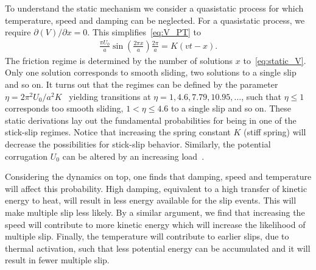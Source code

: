 To understand the static mechanism we consider a quasistatic process for which temperature, speed and damping can be neglected. For a quasistatic process, we require $\partial(V)/\partial x = 0$. This simplifies~\cref{eq:V_PT} to 
\begin{align}
  \frac{\pi U_0}{a} \sin\left(\frac{2\pi x}{a}\right) \frac{2 \pi}{a} = K(vt - x).
  \label{eq:static_V}
\end{align}
The friction regime is determined by the number of solutions $x$ to~\cref{eq:static_V}. Only one solution corresponds to
smooth sliding, two solutions to a single slip and so on. It turns out that the
regimes can be defined by the parameter $\eta = 2\pi^2U_0/a^2K$~\cite{Johnson_1998, Medyanik_2006} yielding transitions at $\eta = 1, 4.6, 7.79, 10.95, \hdots$, such that $\eta \le 1$
corresponds too smooth sliding, $1<\eta \le 4.6$ to a single slip and so on. These static derivations lay out the fundamental probabilities for being in one of the stick-slip regimes. Notice that increasing the spring constant $K$ (stiff spring) will decrease the possibilities for stick-slip behavior. Similarly, the potential corrugation $U_0$ can be altered by an increasing load~\cite{Vanossi_2013}.

Considering the dynamics on top, one finds that damping, speed and temperature will affect this probability. High damping, equivalent to a high transfer
of kinetic energy to heat, will result in less energy available for the slip events. This will make multiple slip less likely. By a similar argument, we find that increasing the speed will contribute to more kinetic energy which will increase the likelihood of multiple slip. Finally, the temperature will contribute to earlier slips, due to thermal activation, such that
less potential energy can be accumulated and it will result in fewer multiple slip. 






